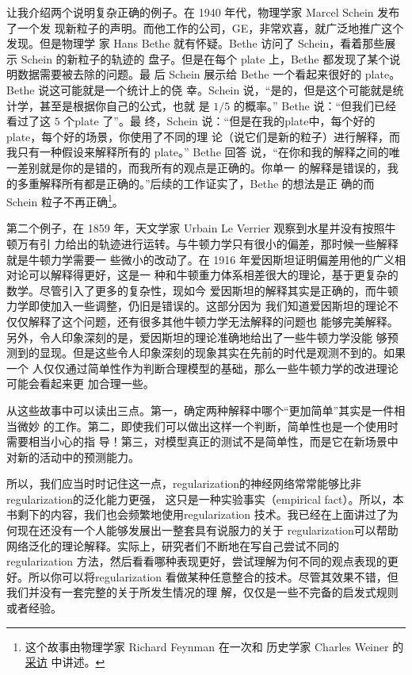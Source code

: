 让我介绍两个说明复杂正确的例子。在 1940 年代，物理学家 Marcel Schein 发布了一个发
现新粒子的声明。而他工作的公司，GE，非常欢喜，就广泛地推广这个发现。但是物理学
家 Hans Bethe 就有怀疑。Bethe 访问了 Schein，看着那些展示 Schein 的新粒子的轨迹的
盘子。但是在每个 plate 上，Bethe 都发现了某个说明数据需要被去除的问题。最
后 Schein 展示给 Bethe 一个看起来很好的 plate。Bethe 说这可能就是一个统计上的侥
幸。Schein 说，“是的，但是这个可能就是统计学，甚至是根据你自己的公式，也就
是 $1/5$ 的概率。” Bethe 说：“但我们已经看过了这 $5$ 个plate 了”。最
终，Schein 说：“但是在我的plate中，每个好的plate，每个好的场景，你使用了不同的理
论（说它们是新的粒子）进行解释，而我只有一种假设来解释所有的 plate。” Bethe 回答
说，“在你和我的解释之间的唯一差别就是你的是错的，而我所有的观点是正确的。你单一
的解释是错误的，我的多重解释所有都是正确的。”后续的工作证实了，Bethe 的想法是正
确的而 Schein 粒子不再正确\footnote{这个故事由物理学家 Richard Feynman 在一次和
历史学家 Charles Weiner 的%
  \href{https://www.aip.org/history-programs/niels-bohr-library/oral-histories/5020-4}{采访}%
  中讲述。}。

第二个例子，在 1859 年，天文学家 Urbain Le Verrier 观察到水星并没有按照牛顿万有引
力给出的轨迹进行运转。与牛顿力学只有很小的偏差，那时候一些解释就是牛顿力学需要一
些微小的改动了。在 1916 年爱因斯坦证明偏差用他的广义相对论可以解释得更好，这是一
种和牛顿重力体系相差很大的理论，基于更复杂的数学。尽管引入了更多的复杂性，现如今
爱因斯坦的解释其实是正确的，而牛顿力学即使加入一些调整，仍旧是错误的。这部分因为
我们知道爱因斯坦的理论不仅仅解释了这个问题，还有很多其他牛顿力学无法解释的问题也
能够完美解释。另外，令人印象深刻的是，爱因斯坦的理论准确地给出了一些牛顿力学没能
够预测到的显现。但是这些令人印象深刻的现象其实在先前的时代是观测不到的。如果一个
人仅仅通过简单性作为判断合理模型的基础，那么一些牛顿力学的改进理论可能会看起来更
加合理一些。

从这些故事中可以读出三点。第一，确定两种解释中哪个“更加简单”其实是一件相当微妙
的工作。第二，即使我们可以做出这样一个判断，简单性也是一个使用时需要相当小心的指
导！第三，对模型真正的测试不是简单性，而是它在新场景中对新的活动中的预测能力。

所以，我们应当时时记住这一点，\gls*{regularization}的神经网络常常能够比非\gls*{regularization}的泛化能力更强，
这只是一种实验事实（empirical fact）。所以，本书剩下的内容，我们也会频繁地使用\gls*{regularization}%
技术。我已经在上面讲过了为何现在还没有一个人能够发展出一整套具有说服力的关于
\gls*{regularization}可以帮助网络泛化的理论解释。实际上，研究者们不断地在写自己尝试不同的\gls*{regularization}
方法，然后看看哪种表现更好，尝试理解为何不同的观点表现的更好。所以你可以将\gls*{regularization}
看做某种任意整合的技术。尽管其效果不错，但我们并没有一套完整的关于所发生情况的理
解，仅仅是一些不完备的启发式规则或者经验。

